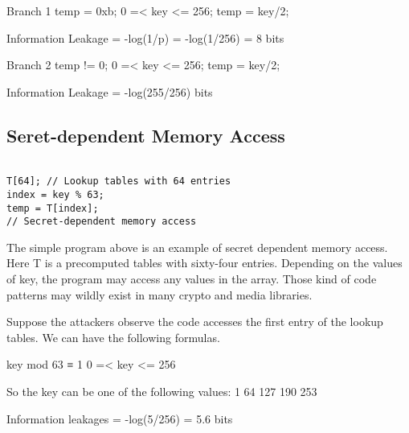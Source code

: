 Branch 1
temp = 0xb;
0 =< key <= 256;
temp = key/2;

Information Leakage = -log(1/p) = -log(1/256) = 8 bits

Branch 2
temp != 0; 
0 =< key <= 256;
temp = key/2;

Information Leakage = -log(255/256) bits

\subsection{Seret-dependent Memory Access}

\begin{lstlisting}

T[64]; // Lookup tables with 64 entries
index = key % 63;
temp = T[index]; 
// Secret-dependent memory access       

\end{lstlisting}

The simple program above is an example of secret dependent memory access. Here T is a precomputed tables with sixty-four entries. Depending on the values of key, the program may access any values in the array. Those kind of code patterns may wildly exist in many crypto and media libraries. 

Suppose the attackers observe the code accesses the first entry of the lookup tables. We can have the following formulas.

key mod 63 ≡ 1
0 =< key <= 256

So the key can be one of the following values:
1 64 127 190 253

Information leakages = -log(5/256) =  5.6 bits

